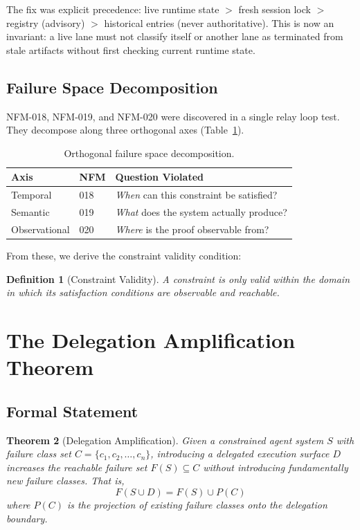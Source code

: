 \documentclass[11pt,letterpaper]{article}
\newtheorem{theorem}{Theorem}
\newtheorem{definition}[theorem]{Definition}
\begin{document}
The fix was explicit precedence: live runtime state $>$ fresh session lock $>$ registry (advisory) $>$ historical entries (never authoritative). This is now an invariant: a live lane must not classify itself or another lane as terminated from stale artifacts without first checking current runtime state.

\subsection{Failure Space Decomposition}

NFM-018, NFM-019, and NFM-020 were discovered in a single relay loop test. They decompose along three orthogonal axes (Table~\ref{tab:decomposition}).

\begin{table}[h]
\centering
\caption{Orthogonal failure space decomposition.}
\label{tab:decomposition}
\begin{tabular}{lll}
\toprule
\textbf{Axis} & \textbf{NFM} & \textbf{Question Violated} \\
\midrule
Temporal & 018 & \textit{When} can this constraint be satisfied? \\
Semantic & 019 & \textit{What} does the system actually produce? \\
Observational & 020 & \textit{Where} is the proof observable from? \\
\bottomrule
\end{tabular}
\end{table}

From these, we derive the constraint validity condition:

\begin{definition}[Constraint Validity]
A constraint is only valid within the domain in which its satisfaction conditions are observable and reachable.
\end{definition}

\section{The Delegation Amplification Theorem}

\subsection{Formal Statement}

\begin{theorem}[Delegation Amplification]
Given a constrained agent system $S$ with failure class set $C = \{c_1, c_2, \ldots, c_n\}$, introducing a delegated execution surface $D$ increases the reachable failure set $F(S) \subseteq C$ without introducing fundamentally new failure classes. That is,
\begin{equation}
  F(S \cup D) = F(S) \cup P(C)
\end{equation}
where $P(C)$ is the projection of existing failure classes onto the delegation boundary.
\end{theorem}
\end{document}
